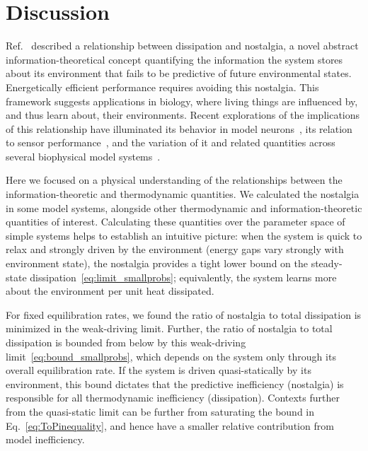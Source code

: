 \documentclass[entropy,article,
submit,
moreauthors,pdftex,10pt,a4paper]{mdpi}
\begin{document}
\section{Discussion}

Ref.~\cite{Still2012} described a relationship between dissipation and nostalgia, a novel abstract information-theoretical concept quantifying the information the system stores about its environment that fails to be predictive of future environmental states. Energetically efficient performance requires avoiding this nostalgia. This framework suggests applications in biology, where living things are influenced by, and thus learn about, their environments. 
Recent explorations of the implications of this relationship have illuminated its behavior in model neurons~\cite{mcintosh2012information}, its relation to sensor performance~\cite{hartich2016sensory}, and the variation of it and related quantities across several biophysical model systems~\cite{Brittain2017}.

Here we focused on a
physical understanding of the relationships between the information-theoretic and thermodynamic quantities. We calculated the nostalgia in some model systems, alongside other thermodynamic and information-theoretic quantities of interest. 
Calculating these quantities over the parameter space of simple systems helps to establish an intuitive picture: 
when the system is quick to relax and strongly driven by the environment (energy gaps vary strongly with environment state), the nostalgia provides a tight lower bound on the steady-state dissipation~\eqref{eq:limit_smallprobs}; equivalently, the system learns more about the environment per unit heat dissipated. 

For fixed equilibration rates, we found the ratio of nostalgia to total dissipation is minimized in the weak-driving limit. Further, the ratio of nostalgia to total dissipation is bounded from below by this weak-driving limit~\eqref{eq:bound_smallprobs}, which depends on the system only through its overall equilibration rate. If the system is driven quasi-statically by its environment, this bound dictates that the predictive inefficiency (nostalgia) is responsible for all thermodynamic inefficiency (dissipation). 
Contexts further from the quasi-static limit can be further from saturating the bound in Eq.~\eqref{eq:ToPinequality}, and hence have a smaller relative contribution from model inefficiency. 
\end{document}
